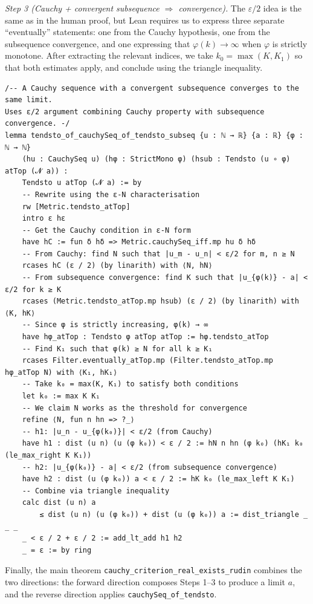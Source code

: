 \documentclass[11pt]{article}
\begin{document}
\smallskip
\noindent
\emph{Step 3 (Cauchy + convergent subsequence \(\Rightarrow\) convergence).}
The \(\varepsilon/2\) idea is the same as in the human proof, but Lean requires us to express three separate ``eventually'' statements:
one from the Cauchy hypothesis, one from the subsequence convergence, and one expressing that \(\varphi(k)\to\infty\) when \(\varphi\) is strictly monotone.
After extracting the relevant indices, we take \(k_0=\max(K,K_1)\) so that both estimates apply, and conclude using the triangle inequality.

\begin{verbatim}
/-- A Cauchy sequence with a convergent subsequence converges to the same limit.
Uses ε/2 argument combining Cauchy property with subsequence convergence. -/
lemma tendsto_of_cauchySeq_of_tendsto_subseq {u : ℕ → ℝ} {a : ℝ} {φ : ℕ → ℕ}
    (hu : CauchySeq u) (hφ : StrictMono φ) (hsub : Tendsto (u ∘ φ) atTop (𝓝 a)) :
    Tendsto u atTop (𝓝 a) := by
    -- Rewrite using the ε-N characterisation
    rw [Metric.tendsto_atTop]
    intro ε hε
    -- Get the Cauchy condition in ε-N form
    have hC := fun δ hδ => Metric.cauchySeq_iff.mp hu δ hδ
    -- From Cauchy: find N such that |u_m - u_n| < ε/2 for m, n ≥ N
    rcases hC (ε / 2) (by linarith) with ⟨N, hN⟩
    -- From subsequence convergence: find K such that |u_{φ(k)} - a| < ε/2 for k ≥ K
    rcases (Metric.tendsto_atTop.mp hsub) (ε / 2) (by linarith) with ⟨K, hK⟩
    -- Since φ is strictly increasing, φ(k) → ∞
    have hφ_atTop : Tendsto φ atTop atTop := hφ.tendsto_atTop
    -- Find K₁ such that φ(k) ≥ N for all k ≥ K₁
    rcases Filter.eventually_atTop.mp (Filter.tendsto_atTop.mp hφ_atTop N) with ⟨K₁, hK₁⟩
    -- Take k₀ = max(K, K₁) to satisfy both conditions
    let k₀ := max K K₁
    -- We claim N works as the threshold for convergence
    refine ⟨N, fun n hn => ?_⟩
    -- h1: |u_n - u_{φ(k₀)}| < ε/2 (from Cauchy)
    have h1 : dist (u n) (u (φ k₀)) < ε / 2 := hN n hn (φ k₀) (hK₁ k₀ (le_max_right K K₁))
    -- h2: |u_{φ(k₀)} - a| < ε/2 (from subsequence convergence)
    have h2 : dist (u (φ k₀)) a < ε / 2 := hK k₀ (le_max_left K K₁)
    -- Combine via triangle inequality
    calc dist (u n) a
        ≤ dist (u n) (u (φ k₀)) + dist (u (φ k₀)) a := dist_triangle _ _ _
    _ < ε / 2 + ε / 2 := add_lt_add h1 h2
    _ = ε := by ring
\end{verbatim}

\medskip
\noindent
Finally, the main theorem \verb|cauchy_criterion_real_exists_rudin| combines the two directions:
the forward direction composes Steps 1--3 to produce a limit \(a\), and the reverse direction applies \verb|cauchySeq_of_tendsto|.
\end{document}
